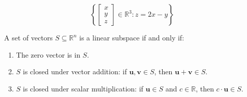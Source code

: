 \[
\left\{
\begin{bmatrix}
x \\ y \\ z
\end{bmatrix}
\in \mathbb{R}^3 : z = 2x - y
\right\}
\]

A set of vectors \( S \subseteq \mathbb{R}^n \) is a linear subspace if and only if:
\begin{enumerate}
    \item The zero vector is in \( S \).
    \item \( S \) is closed under vector addition: if \( \mathbf{u}, \mathbf{v} \in S \), then \( \mathbf{u} + \mathbf{v} \in S \).
    \item \( S \) is closed under scalar multiplication: if \( \mathbf{u} \in S \) and \( c \in \mathbb{R} \), then \( c \cdot \mathbf{u} \in S \).
\end{enumerate}

